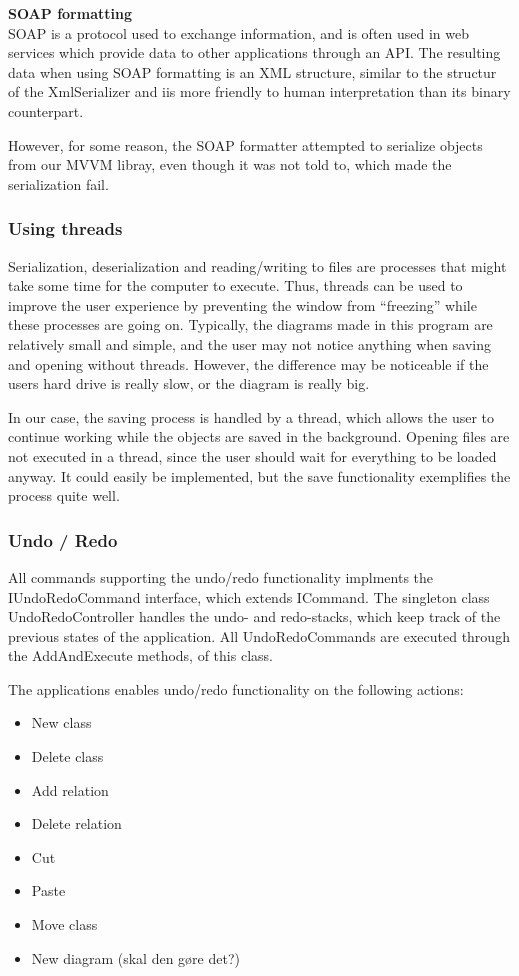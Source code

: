 \textbf{SOAP formatting}\\ SOAP is a protocol used to exchange information, and
is often used in web services which provide data to other applications through
an API. The resulting data when using SOAP formatting is an XML structure,
similar to the structur of the XmlSerializer and iis more friendly to human
interpretation than its binary counterpart.

However, for some reason, the SOAP formatter attempted to serialize objects from
our MVVM libray, even though it was not told to, which made the serialization
fail.

\subsubsection{Using threads} 

Serialization, deserialization and reading/writing
to files are processes that might take some time for the computer to execute.
Thus, threads can be used to improve the user experience by preventing the
window from “freezing” while these processes are going on. Typically, the
diagrams made in this program are relatively small and simple, and the user may
not notice anything when saving and opening without threads. However, the
difference may be noticeable if the users hard drive is really slow, or the
diagram is really big.

In our case, the saving process is handled by a thread, which allows the user to
continue working while the objects are saved in the background. Opening files
are not executed in a thread, since the user should wait for everything to be
loaded anyway. It could easily be implemented, but the save functionality
exemplifies the process quite well.


\subsubsection{Undo / Redo}
All commands supporting the undo/redo functionality implments the
IUndoRedoCommand interface, which extends ICommand. The singleton class
UndoRedoController handles the undo- and redo-stacks, which keep track of the
previous states of the application. All UndoRedoCommands are executed through
the AddAndExecute methods, of this class.

The applications enables undo/redo functionality on the following actions:


\begin{itemize} 
	\item New class 
	\item Delete class 
	\item Add relation 
	\item Delete relation 
	\item Cut 
	\item Paste 
	\item Move class 
	\item New diagram (skal den gøre det?) 
\end{itemize}


